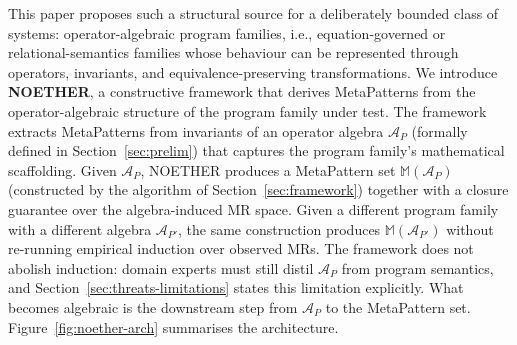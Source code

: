 \documentclass[manuscript]{acmart}
\begin{document}
This paper proposes such a structural source for a deliberately bounded class of systems: operator-algebraic program families, i.e., equation-governed or relational-semantics families whose behaviour can be represented through operators, invariants, and equivalence-preserving transformations. We introduce \textbf{NOETHER}, a constructive framework that derives MetaPatterns from the operator-algebraic structure of the program family under test. The framework extracts MetaPatterns from invariants of an operator algebra $\mathcal{A}_P$ (formally defined in Section~\ref{sec:prelim}) that captures the program family's mathematical scaffolding. Given $\mathcal{A}_P$, NOETHER produces a MetaPattern set $\mathbb{M}(\mathcal{A}_P)$ (constructed by the algorithm of Section~\ref{sec:framework}) together with a closure guarantee over the algebra-induced MR space. Given a different program family with a different algebra $\mathcal{A}_{P'}$, the same construction produces $\mathbb{M}(\mathcal{A}_{P'})$ without re-running empirical induction over observed MRs. The framework does not abolish induction: domain experts must still distil $\mathcal{A}_P$ from program semantics, and Section~\ref{sec:threats-limitations} states this limitation explicitly. What becomes algebraic is the downstream step from $\mathcal{A}_P$ to the MetaPattern set. Figure~\ref{fig:noether-arch} summarises the architecture.
\end{document}
